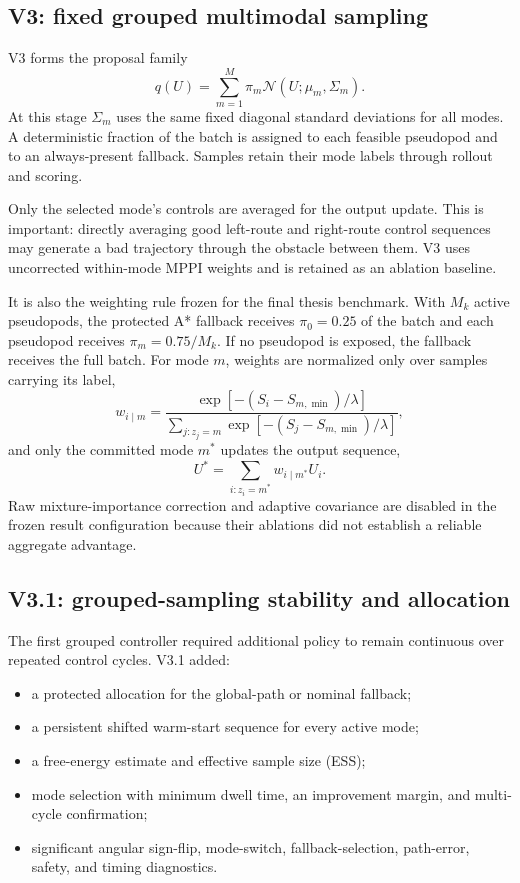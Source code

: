 \documentclass[11pt,a4paper]{article}
\newcommand{\Normal}{\mathcal{N}}
\begin{document}
\subsection{V3: fixed grouped multimodal sampling}

V3 forms the proposal family
\begin{equation}
  q(U) = \sum_{m=1}^{M}\pi_m
  \Normal(U;\mu_m,\Sigma_m).
\end{equation}
At this stage $\Sigma_m$ uses the same fixed diagonal standard deviations for
all modes. A deterministic fraction of the batch is assigned to each feasible
pseudopod and to an always-present fallback. Samples retain their mode labels
through rollout and scoring.

Only the selected mode's controls are averaged for the output update. This is
important: directly averaging good left-route and right-route control
sequences may generate a bad trajectory through the obstacle between them.
V3 uses uncorrected within-mode MPPI weights and is retained as an ablation
baseline.

It is also the weighting rule frozen for the final thesis benchmark. With
$M_k$ active pseudopods, the protected A* fallback receives
$\pi_0=0.25$ of the batch and each pseudopod receives
$\pi_m=0.75/M_k$. If no pseudopod is exposed, the fallback receives the full
batch. For mode $m$, weights are normalized only over samples carrying its
label,
\begin{equation}
  w_{i\mid m}=\frac{\exp[-(S_i-S_{m,\min})/\lambda]}
  {\sum_{j:z_j=m}\exp[-(S_j-S_{m,\min})/\lambda]},
\end{equation}
and only the committed mode $m^*$ updates the output sequence,
\begin{equation}
  U^*=\sum_{i:z_i=m^*}w_{i\mid m^*}U_i.
\end{equation}
Raw mixture-importance correction and adaptive covariance are disabled in the
frozen result configuration because their ablations did not establish a
reliable aggregate advantage.

\subsection{V3.1: grouped-sampling stability and allocation}

The first grouped controller required additional policy to remain continuous
over repeated control cycles. V3.1 added:
\begin{itemize}[leftmargin=*]
  \item a protected allocation for the global-path or nominal fallback;
  \item a persistent shifted warm-start sequence for every active mode;
  \item a free-energy estimate and effective sample size (ESS);
  \item mode selection with minimum dwell time, an improvement margin, and
  multi-cycle confirmation;
  \item significant angular sign-flip, mode-switch, fallback-selection,
  path-error, safety, and timing diagnostics.
\end{itemize}
\end{document}
